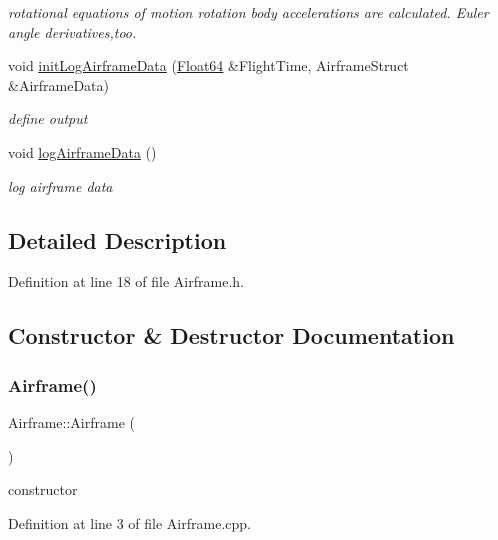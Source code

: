 \begin{DoxyCompactItemize}
\begin{DoxyCompactList}\small\item\em rotational equations of motion rotation body accelerations are calculated. Euler angle derivatives,too. \end{DoxyCompactList}\item 
void \hyperlink{class_airframe_ac1c2c7b3b51e6780b544e4df897cb585}{init\+Log\+Airframe\+Data} (\hyperlink{group___tools_ga3f1431cb9f76da10f59246d1d743dc2c}{Float64} \&Flight\+Time, Airframe\+Struct \&Airframe\+Data)
\begin{DoxyCompactList}\small\item\em define output \end{DoxyCompactList}\item 
void \hyperlink{class_airframe_ab5b3c30a5d3d6d5e89b3dfdd0dbd14e4}{log\+Airframe\+Data} ()
\begin{DoxyCompactList}\small\item\em log airframe data \end{DoxyCompactList}\end{DoxyCompactItemize}


\subsection{Detailed Description}


Definition at line 18 of file Airframe.\+h.



\subsection{Constructor \& Destructor Documentation}
\mbox{\label{class_airframe_a5e6632c7d0c5bc5b889de6cc2407944f}} 
\subsubsection{\texorpdfstring{Airframe()}{Airframe()}}
{\footnotesize\ttfamily Airframe\+::\+Airframe (\begin{DoxyParamCaption}{ }\end{DoxyParamCaption})}



constructor 



Definition at line 3 of file Airframe.\+cpp.

